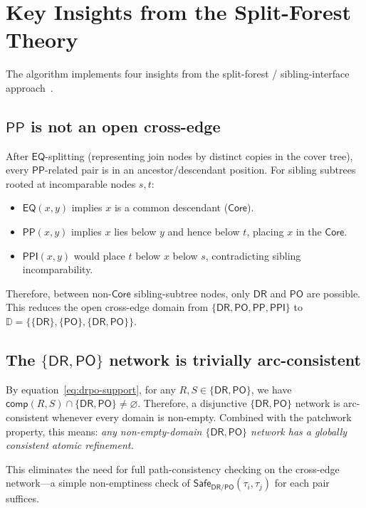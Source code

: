 \documentclass[a4paper,11pt]{article}
\theoremstyle{definition}
\newcommand{\DR}{\ensuremath{\mathsf{DR}}}
\newcommand{\PO}{\ensuremath{\mathsf{PO}}}
\newcommand{\EQ}{\ensuremath{\mathsf{EQ}}}
\newcommand{\PP}{\ensuremath{\mathsf{PP}}}
\newcommand{\PPI}{\ensuremath{\mathsf{PPI}}}
\newcommand{\comp}{\ensuremath{\mathsf{comp}}}
\newcommand{\Safe}{\ensuremath{\mathsf{Safe}}}
\newcommand{\OpenDom}{\ensuremath{\mathbb{D}}}
\newcommand{\Core}{\ensuremath{\mathsf{Core}}}
\newcommand{\RCCrels}{\{\DR,\PO,\PP,\PPI\}}
\begin{document}
\section{Key Insights from the Split-Forest Theory}
\label{sec:key-insights}

The algorithm implements four insights from the split-forest /
sibling-interface approach~\cite{SiblingCompleted,CoverTree}.

\subsection{$\PP$ is not an open cross-edge}

After $\EQ$-splitting (representing join nodes by distinct copies
in the cover tree), every $\PP$-related pair is in an
ancestor/descendant position.  For sibling subtrees rooted at
incomparable nodes $s, t$:
\begin{itemize}[nosep]
  \item $\EQ(x,y)$ implies $x$ is a common descendant ($\Core$).
  \item $\PP(x,y)$ implies $x$ lies below $y$ and hence below $t$,
    placing $x$ in the $\Core$.
  \item $\PPI(x,y)$ would place $t$ below $x$ below $s$,
    contradicting sibling incomparability.
\end{itemize}
Therefore, between non-$\Core$ sibling-subtree nodes, only $\DR$
and $\PO$ are possible.  This reduces the open cross-edge domain
from $\RCCrels$ to $\OpenDom = \{\{\DR\}, \{\PO\}, \{\DR,\PO\}\}$.

\subsection{The $\{\DR,\PO\}$ network is trivially arc-consistent}

By equation~\eqref{eq:drpo-support}, for any
$R, S \in \{\DR, \PO\}$, we have
$\comp(R, S) \cap \{\DR, \PO\} \neq \varnothing$.
Therefore, a disjunctive $\{\DR,\PO\}$ network is arc-consistent
whenever every domain is non-empty.  Combined with the patchwork
property, this means: \emph{any non-empty-domain $\{\DR,\PO\}$
network has a globally consistent atomic refinement.}

This eliminates the need for full path-consistency checking on the
cross-edge network---a simple non-emptiness check of
$\Safe_{\DR/\PO}(\tau_i, \tau_j)$ for each pair suffices.
\end{document}
